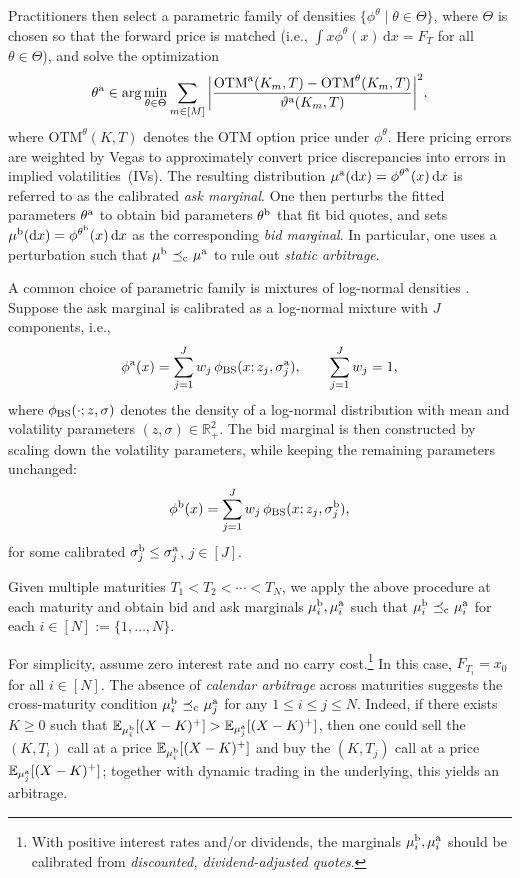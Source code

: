 \documentclass[11pt]{article}
\newcommand{\R}{\mathbb{R}} %
\theoremstyle{plain}
\theoremstyle{definition}
\theoremstyle{remark}
\newcommand{\E}{\mathbb{E}}
\newcommand*{\rd}{\mathrm{d}}
\newcommand*{\dd}{\, \rd}
\DeclareMathOperator{\cleq}{\,\preceq_{\rm c}\,}
\theoremstyle{plain}
\begin{document}
Practitioners then select a parametric family of densities $\{\phi^\theta\mid \theta\in\Theta\}$, where $\Theta$ is chosen so that the forward price is matched (i.e., $\int x \phi^\theta(x)\dd x = F_T$ for all $\theta\in\Theta$), and solve the  optimization
\begin{align*}
   \theta^{\rm a} \in \arg\min_{\theta \in \Theta} \sum_{m\in[M]}
   \bigg|\frac{\text{OTM}^{\rm a}(K_m,T) - \text{OTM}^{\theta}(K_m,T)}{\vartheta^{\rm a}(K_m,T)}\bigg|^2,
\end{align*}
where $\text{OTM}^{\theta}(K,T)$ denotes the OTM option price under $\phi^\theta$. Here pricing errors are weighted by Vegas to approximately convert price discrepancies into errors in implied volatilities~(IVs). The resulting distribution $\mu^{\rm a}(\rd x)=\phi^{\theta^{\rm a}}(x)\dd x$ is referred to as the calibrated \emph{ask marginal}. One then perturbs the fitted parameters $\theta^{\rm a}$ to obtain bid parameters $\theta^{\rm b}$ that fit bid quotes, and sets $\mu^{\rm b}(\rd x)=\phi^{\theta^{\rm b}}(x)\dd x$ as the corresponding \emph{bid marginal}. In particular, one uses a perturbation such that $\mu^{\rm b}\cleq \mu^{\rm a}$ to rule out \emph{static arbitrage}.

A common choice of parametric family is mixtures of log-normal densities \cite{brigoMercurio}. %
Suppose the ask marginal is calibrated as a log-normal mixture with $J$ components, i.e.,
\[
\phi^{\rm a}(x)=\sum_{j=1}^J w_j\,\phi_{\rm BS}(x;z_j,\sigma_j^{\rm a}),
\qquad \sum_{j=1}^J w_j=1,
\]
where $\phi_{\rm BS}(\cdot;z,\sigma)$ denotes the density of a log-normal distribution with mean and volatility parameters $(z,\sigma)\in\R_+^2$. The bid marginal is then constructed by scaling down the volatility parameters, while keeping the remaining parameters unchanged:
\[
\phi^{\rm b}(x)=\sum_{j=1}^J w_j\,\phi_{\rm BS}(x;z_j,\sigma_j^{\rm b}),
\]
for some calibrated $\sigma_j^{\rm b}\leq \sigma_j^{\rm a}$, $j\in[J]$.

Given multiple maturities $T_1 <  T_2 <  \cdots < T_N$, we apply the above procedure at each maturity and obtain bid and ask marginals $\mu_i^{\rm b},\mu_i^{\rm a}$ such that $\mu_i^{\rm b}\cleq \mu_i^{\rm a}$ for each $i\in[N]:=\{1,\dots, N\}$.

For simplicity, assume zero interest rate and no carry cost.\footnote{With positive interest rates and/or dividends, the marginals $\mu_i^{\rm b},\mu_i^{\rm a}$ should be calibrated from \emph{discounted, dividend-adjusted quotes}.} In this case, $F_{T_i}=x_0$ for all $i\in[N]$. The absence of \emph{calendar arbitrage} across maturities suggests the cross-maturity condition $\mu_i^{\rm b}\cleq \mu_j^{\rm a}$ for any $1\leq i\leq j\leq N$. Indeed, if there exists $K\geq 0$ such that $\E_{\mu_i^{\rm b}}[(X-K)^+]>\E_{\mu_j^{\rm a}}[(X-K)^+]$, then one could sell the $(K,T_i)$ call at a price  $\E_{\mu_i^{\rm b}}[(X-K)^+]$ and buy the $(K,T_j)$ call at a price   $\E_{\mu_j^{\rm a}}[(X-K)^+]$; together with dynamic trading in the underlying, this yields an arbitrage. 
\end{document}
